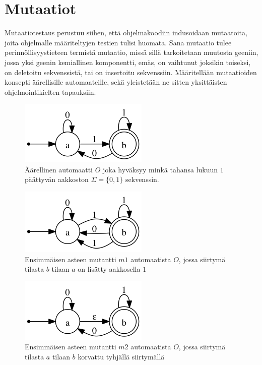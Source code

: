 \documentclass{tktltiki}
\begin{document}
\section{Mutaatiot}
Mutaatiotestaus perustuu siihen, että ohjelmakoodiin indusoidaan mutaatoita, joita ohjelmalle määriteltyjen testien tulisi huomata. Sana mutaatio tulee perinnöllisyystieteen termistä mutaatio, missä sillä tarkoitetaan muutosta geeniin, jossa yksi geenin kemiallinen komponentti, emäs, on vaihtunut joksikin toiseksi, on deletoitu sekvenssistä, tai on insertoitu sekvenssiin. Määritellään mutaatioiden konsepti äärellisille automaateille, sekä yleistetään ne sitten yksittäisten ohjelmointikielten tapauksiin.

\begin{figure}[here]
\centering
\caption{Äärellinen automaatti $O$ joka hyväksyy minkä tahansa lukuun $1$ päättyvän aakkoston $\Sigma = \{0,1\}$ sekvenssin.}
\label{fig:nfa}
\includegraphics[scale=0.6]{automaatit/nfa.png}
\end{figure}

\begin{figure}[here]
\centering
\caption{Ensimmäisen asteen mutantti $m1$ automaatista $O$, jossa siirtymä tilasta $b$ tilaan $a$ on lisätty aakkosella $1$}
\label{fig:m1}
\includegraphics[scale=0.6]{automaatit/m1.png}
\end{figure}

\begin{figure}[here]
\centering
\caption{Ensimmäisen asteen mutantti $m2$ automaatista $O$, jossa siirtymä tilasta $a$ tilaan $b$ korvattu tyhjällä siirtymällä}
\label{fig:m2}
\includegraphics[scale=0.6]{automaatit/m2.png}
\end{figure}
\end{document}
